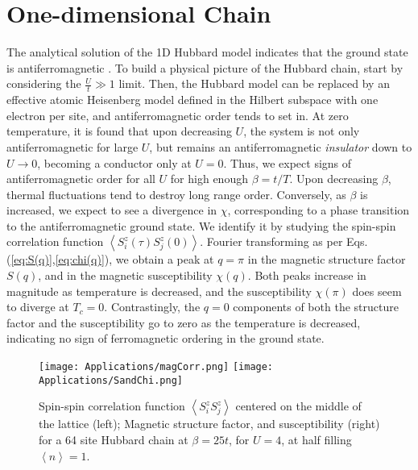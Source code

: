 \section{One-dimensional Chain}
\label{sec:1d-chain}

The analytical solution of the \acs{1D} Hubbard model indicates that the ground state is antiferromagnetic \cite{lieb_absence_1968}.
To build a physical picture of the Hubbard chain, start by considering the $\frac{U}{t} \gg 1$ limit. 
Then, the Hubbard model can be replaced by an effective atomic Heisenberg model defined in the Hilbert subspace with one electron per site, and antiferromagnetic order tends to set in.
At zero temperature, it is found that upon decreasing $U$, the system is not only antiferromagnetic for large $U$, but remains an antiferromagnetic \emph{insulator} down to $U \rightarrow 0$, becoming a conductor only at $U = 0$.
Thus, we expect signs of antiferromagnetic order for all $U$ for high enough $\beta = t / T$.
Upon decreasing $\beta$, thermal fluctuations tend to destroy long range order.
Conversely, as $\beta$ is increased, we expect to see a divergence in $\chi$, corresponding to a phase transition to the antiferromagnetic ground state.
We identify it by studying the spin-spin correlation function $\left\langle S^z_i (\tau) S^z_j (0) \right\rangle$.
Fourier transforming as per Eqs.(\ref{eq:S(q)},\ref{eq:chi(q)}), we obtain a peak at $q = \pi$ in the magnetic structure factor $S ( q ) $, and in the magnetic susceptibility $\chi (q)$.
Both peaks increase in magnitude as temperature is decreased, and the  susceptibility $\chi (\pi)$ does seem to diverge at $T_c = 0$.
Contrastingly, the $q = 0$ components of both the structure factor and the susceptibility go to zero as the temperature is decreased, indicating  no sign of ferromagnetic ordering in the ground state.
\begin{figure}[H]\label{fig:corr_FT}
\texttt{[image: Applications/magCorr.png]}
\hspace{-0.5cm}
\texttt{[image: Applications/SandChi.png]}
\caption[Spin-spin correlation function, magnetic structure factor, and susceptibility for a 64 site Hubbard chain at $\beta = 25 t$, for $U = 4$.]{Spin-spin correlation function $\left\langle S^z_i S^z_j \right\rangle$ centered on the middle of the lattice (left); Magnetic structure factor, and susceptibility (right) for a 64 site Hubbard chain at $\beta = 25 t$, for $U = 4$, at half filling $\left\langle n \right\rangle = 1$.}
\end{figure}
